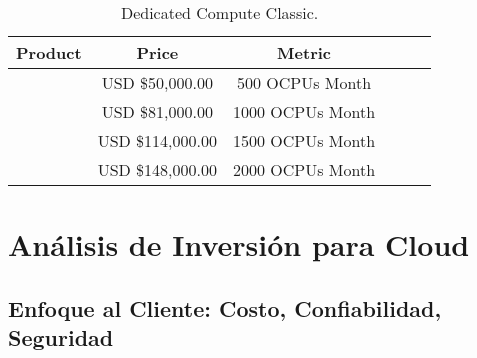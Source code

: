 \begin{table}[ht]
	\caption{Dedicated Compute Classic.}
	\label{tab:hla:results}
\centering
\begin{tabular}{lccccc}
	\toprule
	\multicolumn{1}{c}{\textbf{Product}} 	& \textbf{Price} & \textbf{Metric}\\
	\midrule
\cite{Compute Classic - Model 500} 		& USD \$50,000.00 & 500 OCPUs Month\\
\cite{Compute Classic - Model 1000} 		& USD \$81,000.00 & 1000 OCPUs Month\\
\cite{Compute Classic - Model 1500} 		& USD \$114,000.00 & 1500 OCPUs Month\\
\cite{Compute Classic - Model 2000} 		& USD \$148,000.00 & 2000 OCPUs Month\\

	\midrule
	\bottomrule
\end{tabular}
\end{table}

\section{Análisis de Inversión para Cloud} %
\label{sec:Análisis de Inversión para Cloud}

\subsection{Enfoque al Cliente: Costo, Confiabilidad, Seguridad}
\label{sec:Enfoque al cliente: costo, confiabilidad, seguridad}

